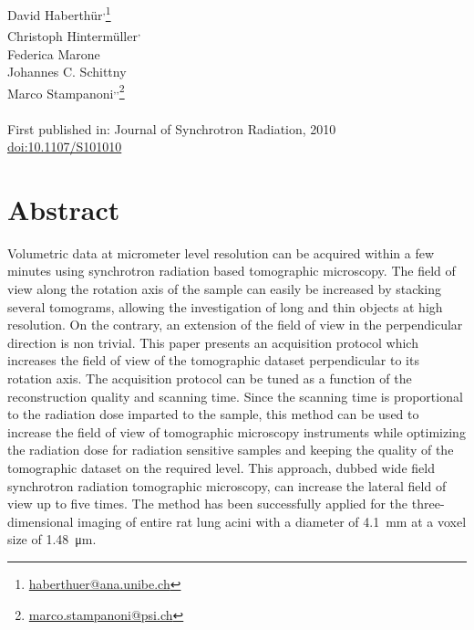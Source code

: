 \acresetall
{}\label{ch:haberthuer2010}

David Haberthür\textsuperscript{,}\footnote{\href{mailto:haberthuer@ana.unibe.ch}{haberthuer@ana.unibe.ch}}\\
Christoph Hintermüller\textsuperscript{,}\\
Federica Marone\\
Johannes C. Schittny\\
Marco Stampanoni\textsuperscript{,}\textsuperscript{,}\footnote{\href{mailto:marco.stampanoni@psi.ch}{marco.stampanoni@psi.ch}}\\\\
First published in: Journal of Synchrotron Radiation, 2010\\
\href{http://journals.iucr.org/s/}{doi:10.1107/S101010}
\vfill
\section{Abstract}
Volumetric data at micrometer level resolution can be acquired within a few minutes using synchrotron radiation based tomographic microscopy. The field of view along the rotation axis of the sample can easily be increased by stacking several tomograms, allowing  the investigation of long and thin objects at high resolution. On the contrary, an extension of the field of view in the perpendicular direction is non trivial. This paper presents an acquisition protocol which increases the field of view of the tomographic dataset perpendicular to its rotation axis. The acquisition protocol can be tuned as a function of the reconstruction quality and scanning time. Since the scanning time is proportional to the radiation dose imparted to the sample, this method can be used to increase the field of view of tomographic microscopy instruments while optimizing the radiation dose for radiation sensitive samples and keeping the quality of the tomographic dataset on the required level. This approach, dubbed wide field synchrotron radiation tomographic microscopy, can increase the lateral field of view up to five times. The method has been successfully applied for the three-dimensional imaging of entire rat lung acini with a diameter of \SI{4.1}{\milli\meter} at a voxel size of \SI{1.48}{\micro\meter}.
\clearpage
